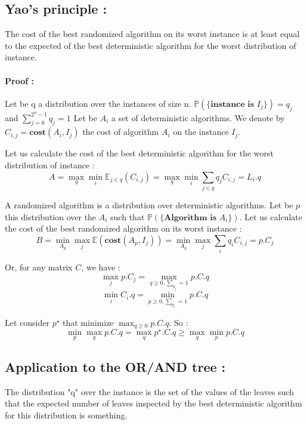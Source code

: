 
\subsection{Yao's principle :}

The cost of the best randomized algorithm on its worst instance is at least equal to the expected of the best deterministic algorithm for the worst distribution of instance.

\paragraph{Proof :}

Let be q a distribution over the instances of size n. $\mathbb{P}(\{\textbf{instance is }I_{j}\})=q_{j}$ and $\displaystyle{\sum_{j=0}^{2^n-1} q_{j} = 1}$
Let be $A_{i}$ a set of deterministic algorithms. We denote by $C_{i,j}= \textbf{cost}(A_{i},I_{j})$ the cost of algorithm $A_{i}$ on the instance $I_{j}$.

Let us calculate the cost of the best deterministic algorithm for the worst distribution of instance :
$$\displaystyle{A = \max_{q} \min_{i} \mathbb{E}_{j\in q} (C_{i,j}) = \max_{q} \min_{i} \sum_{j \in q} q_{j}C_{i,j} = L_{i}.q}$$
 
A randomized algorithm is a distribution over deterministic algorithms. Let be $p$ this distribution over the $A_{i}$ such that $\mathbb{P}(\{\textbf{Algorithm is } A_{i}\})$.
Let us calculate the cost of the best randomized algorithm on its worst instance :
$$\displaystyle{B = \min_{A_{p}} \max_{j} \mathbb{E}(\textbf{cost}(A_{p},I_{j})) = \min_{A_{p}} \max_{j} \sum_{i} q_{i}C_{i,j} = p.C_{j}}$$

Or, for any matrix $C$, we have :
$$\displaystyle{\max_{j}p.C_{j} = \max_{q\geq 0, \sum_{q_{j}}=1} p.C.q}$$
$$\displaystyle{\min_{i}C_{i}.q = \min_{p\geq 0, \sum_{p_{i}}=1} p.C.q}$$

Let consider $p^{\star}$ that minimize $\displaystyle{\max_{q\geq 0} p.C.q}$. So :
$$\displaystyle{\min_{p} \max_{q} p.C.q = \max_{q}p^{\star}.C.q \geq \max_{q} \min_{p} p.C.q} $$
\flushright{$\square$}
\flushleft

\subsection{Application to the OR/AND tree :} 
The distribution "q" over the instance is the set of the values of the leaves such that the expected number of leaves inspected by the best deterministic algorithm for this distribution is something.

